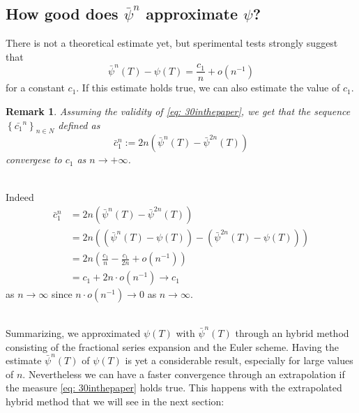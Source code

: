 \documentclass[a4paper,italian,11pt]{book}
\newtheorem{remark}{Remark}
\theoremstyle{plain}
\theoremstyle{remark}
\theoremstyle{plain}
\begin{document}
\subsection{How good does $\bar{\psi}^n$ approximate $\psi$?}
\label{subsection: rrfirst_estimate}
\noindent
There is not a theoretical estimate yet, but sperimental tests strongly suggest that 
\begin{equation}
    \label{eq: 30inthepaper}
    \bar{\psi}^n(T) - \psi(T) = \frac{c_1}{n}+ o(n^{-1})
\end{equation}
for a constant $c_1$.
If this estimate holds true, we can also estimate the value of $c_1$.
\begin{remark} \label{remark: c1_series}
\textit{Assuming the validity of \eqref{eq: 30inthepaper}, we get that the sequence $\left\{ \bar{c_1}^n \right\}_{n\in N}$ defined as
\begin{equation}
    \label{eq: 32inthepaper}
    \bar{c}_1^n := 2n \left( \bar{\psi}^n(T) - \bar{\psi}^{2n}(T) \right)
\end{equation}
convergese to $c_1$ as $n\to +\infty$.}
\end{remark}
\\
Indeed
\begin{equation*}
\begin{aligned}
    \bar{c}_1^n &= 2n \left( \bar{\psi}^n(T) - \bar{\psi}^{2n}(T) \right) \\
    &= 2n \left( \left( \bar{\psi}^n(T) - \psi(T) \right)  - \left( \bar{\psi}^{2n}(T) - \psi(T) \right)\right) \\
    &= 2n\left( \frac{c_1}{n} -\frac{c_1}{2n}  + o(n^{-1})\right)\\
    &= c_1 + 2n\cdot o(n^{-1}) \to c_1
\end{aligned}
\end{equation*}
as $n\to \infty$ since $n \cdot o(n^{-1}) \to 0$ as $n\to \infty$.
\\\

Summarizing, we approximated $\psi(T)$ with $\bar{\psi}^n(T)$ through an hybrid method consisting of the fractional series expansion and the Euler scheme. 
Having the estimate $\bar{\psi}^n(T)$ of $\psi(T)$ is yet a considerable result, especially for large values of $n$. 
Nevertheless we can have a faster convergence through an extrapolation if the measure \eqref{eq: 30inthepaper} holds true. This happens with the extrapolated hybrid method that we will see in the next section:
\end{document}

